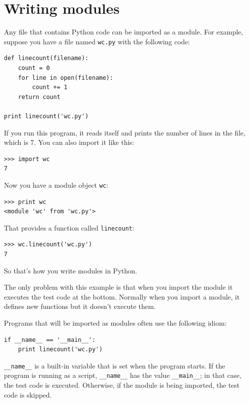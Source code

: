 \documentclass[10pt]{book}
\begin{document}
{\section{Writing modules}
\label{modules}


Any file that contains Python code can be imported as a module.
For example, suppose you have a file named {\tt wc.py} with the following
code:

\beforeverb
\begin{verbatim}
def linecount(filename):
    count = 0
    for line in open(filename):
        count += 1
    return count

print linecount('wc.py')
\end{verbatim}
\afterverb
%
If you run this program, it reads itself and prints the number
of lines in the file, which is 7.
You can also import it like this:

\beforeverb
\begin{verbatim}
>>> import wc
7
\end{verbatim}
\afterverb
%
Now you have a module object {\tt wc}:


\beforeverb
\begin{verbatim}
>>> print wc
<module 'wc' from 'wc.py'>
\end{verbatim}
\afterverb
%
That provides a function called \verb"linecount":

\beforeverb
\begin{verbatim}
>>> wc.linecount('wc.py')
7
\end{verbatim}
\afterverb
%
So that's how you write modules in Python.

The only problem with this example is that when you import
the module it executes the test code at the bottom.  Normally
when you import a module, it defines new functions but it
doesn't execute them.


Programs that will be imported as modules often
use the following idiom:

\beforeverb
\begin{verbatim}
if __name__ == '__main__':
    print linecount('wc.py')
\end{verbatim}
\afterverb
%
\verb"__name__" is a built-in variable that is set when the
program starts.  If the program is running as a script,
\verb"__name__" has the value \verb"__main__"; in that
case, the test code is executed.  Otherwise,
if the module is being imported, the test code is skipped.

}
\end{document}
